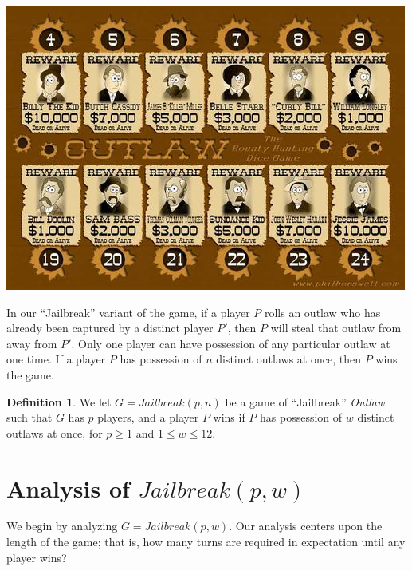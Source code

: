 \documentclass{article}
\theoremstyle{definition}
\newtheorem{defn}{Definition}
\theoremstyle{plain}
\begin{document}
	\begin{center}
	\includegraphics[scale=0.5]{outlaw_board}
	\end{center}
	
	In our ``Jailbreak'' variant of the game, if a player $P$ rolls an outlaw who has already been captured by a distinct player $P'$, then $P$ will steal that outlaw from away from $P'$. Only one player can have possession of any particular outlaw at one time. If a player $P$ has possession of $n$ distinct outlaws at once, then $P$ wins the game.
	
	\begin{defn}
	We let $G = Jailbreak(p, n)$ be a game of ``Jailbreak'' \textit{Outlaw} such that $G$ has $p$ players, and a player $P$ wins if $P$ has possession of $w$ distinct outlaws at once, for $p \geq 1$ and $1 \leq w \leq 12$.
	\end{defn}
	
	\section{Analysis of $Jailbreak(p, w)$}

	We begin by analyzing $G = Jailbreak(p, w)$. Our analysis centers upon the length of the game; that is, how many turns are required in expectation until any player wins?
\end{document}
